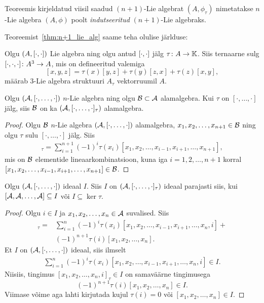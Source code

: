 Teoreemis kirjeldatud viisil saadud $(n+1)$-Lie algebrat $(A, \phi_\tau)$
nimetatakse $n$-Lie algebra $(A, \phi)$ poolt \emph{indutseeritud}
$(n+1)$-Lie algebraks.

Teoreemist~\ref{thm:n+1_lie_alg} saame teha olulise järlduse:

\begin{jar}
    Olgu $(A, \left[ \cdot, \cdot \right])$ Lie algebra ning olgu antud
    $\left[ \cdot, \cdot \right]$ jälg $\tau \colon A \to \mathbb{K}$. Siis ternaarne sulg
    $[ \cdot, \cdot, \cdot ] \colon A^3 \to A$, mis on defineeritud
    valemiga
    \[
        [x, y, z] = \tau(x)[y, z] + \tau(y)[z, x] + \tau(z)[x, y],
    \]
    määrab $3$-Lie algebra struktuuri $A_\tau$ vektorruumil $A$.
\end{jar}

\begin{lau}
    Olgu $(\mathcal{A}, [\cdot, \dots, \cdot])$ $n$-Lie algebra ning olgu
    $\mathcal{B} \subset \mathcal{A}$ alamalgebra. Kui $\tau$ on $[\cdot, \dots, \cdot]$ jälg,
    siis $\mathcal{B}$ on ka $(\mathcal{A}, [\cdot, \dots, \cdot]_\tau)$ alamalgebra.
\end{lau}

\begin{proof}
    Olgu $\mathcal{B}$ $n$-Lie algebra $(\mathcal{A}, [\cdot, \dots, \cdot])$ alamalgebra,
    $x_1, x_2, \dots, x_{n+1} \in \mathcal{B}$ ning olgu $\tau$ sulu $[\cdot, \dots, \cdot]$
    jälg. Siis
    \begin{align*}
        [x_1, x_2, \dots, x_{n+1}]_\tau =  \sum_{i=1}^{n+1} (-1)^i \tau(x_i)
        [x_1, x_2, \dots, x_{i-1}, x_{i+1}, \dots, x_{n+1}],
    \end{align*}
    mis on $\mathcal{B}$ elementide lineaarkombinatsioon, kuna iga $i = 1, 2, \dots, n+1$
    korral $[x_1, x_2, \dots, x_{i-1}, x_{i+1}, \dots, x_{n+1}] \in \mathcal{B}$.
\end{proof}

\begin{lau}
    Olgu $(\mathcal{A}, [\cdot, \dots, \cdot])$ ideaal $I$. Siis $I$ on
    $(\mathcal{A}, [\cdot, \dots, \cdot]_\tau)$ ideaal parajasti siis, kui
    $[\mathcal{A}, \mathcal{A}, \dots, \mathcal{A}] \subseteq I$ või $I \subseteq \ker \tau$.
\end{lau}

\begin{proof}
    Olgu $i \in I$ ja $x_1, x_2, \dots, x_n \in \mathcal{A}$ suvalised. Siis
    \begin{align*}
        [x_1, x_2, \dots, x_n, i]_\tau =  &\sum_{i=1}^{n} (-1)^i \tau(x_i)
        [x_1, x_2, \dots, x_{i-1}, x_{i+1}, \dots, x_n, i] + \\
        &(-1)^{n+1} \tau(i) [x_1, x_2, \dots, x_n].
    \end{align*}
    Et $I$ on $(\mathcal{A}, [\cdot, \dots, \cdot])$ ideaal, siis ilmselt
    \begin{align*}
        \sum_{i=1}^{n} (-1)^i \tau(x_i)
        [x_1, x_2, \dots, x_{i-1}, x_{i+1}, \dots, x_n, i] \in I.
    \end{align*}
    Niisiis, tingimus $[x_1, x_2, \dots, x_n, i]_\tau \in I$ on
    samaväärne tingimusega
    \[ (-1)^{n+1} \tau(i) [x_1, x_2, \dots, x_n] \in I. \]
    Viimase võime aga lahti kirjutada kujul
    $\tau(i) = 0$ või $[x_1, x_2, \dots, x_n] \in I$.
\end{proof}

